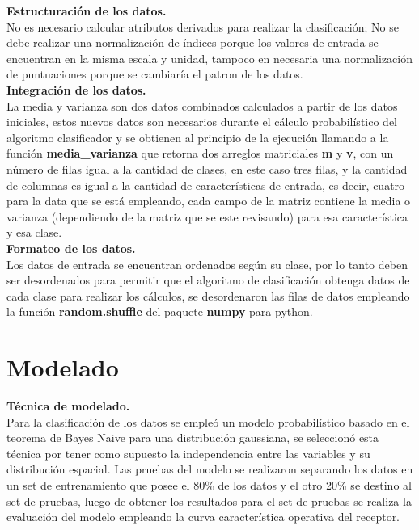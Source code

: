 \noindent
\textbf{Estructuración de los datos.}\\

No es necesario calcular atributos derivados para realizar la clasificación; No se debe realizar
una normalización de índices porque los valores de entrada se encuentran en la misma escala y unidad,
tampoco en necesaria una normalización de puntuaciones porque se cambiaría el patron de los datos.\\

\noindent
\textbf{Integración de los datos.}\\

La media y varianza son dos datos combinados calculados a partir de los datos iniciales, estos nuevos
datos son necesarios durante el cálculo probabilístico del algoritmo clasificador y se
obtienen al principio de la ejecución llamando a la función \textbf{media\_varianza} que retorna
dos arreglos matriciales \textbf{m} y \textbf{v}, con un número de filas igual a la cantidad de clases, en este caso tres filas,
y la cantidad de columnas es igual a la cantidad de características de entrada, es decir, cuatro
para la data que se está empleando, cada campo de la matriz contiene la media o varianza (dependiendo de la
matriz que se este revisando) para esa característica y esa clase.\\

\noindent
\textbf{Formateo de los datos.}\\

Los datos de entrada se encuentran ordenados según su clase, por lo tanto deben ser desordenados
para permitir que el algoritmo de clasificación obtenga datos de cada clase para realizar los
cálculos, se desordenaron las filas de datos empleando la función \textbf{random.shuffle} del paquete
\textbf{numpy} para python.\\

\section{Modelado}

\noindent
\textbf{Técnica de modelado.}\\

Para la clasificación de los datos se empleó un modelo probabilístico basado en el teorema de Bayes Naive para una distribución
gaussiana, se seleccionó esta técnica por tener como supuesto la independencia entre las variables y su distribución
espacial. Las pruebas del modelo se realizaron separando los datos en un set de entrenamiento que posee el 80\% de los
datos y el otro 20\% se destino al set de pruebas, luego de obtener los resultados para el set de pruebas se realiza la
evaluación del modelo empleando la curva característica operativa del receptor.\\

